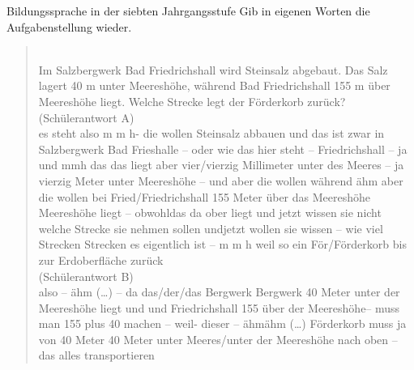 \begin{frame}
  {Bildungssprache in der siebten Jahrgangsstufe}
  \onslide<+->
  \onslide<+->
  \alert{Gib in eigenen Worten die Aufgabenstellung wieder.} \\
  \Halbzeile
  \onslide<+->
  \begin{quote}\footnotesize
    \\
    Im Salzbergwerk Bad Friedrichshall wird Steinsalz abgebaut. Das Salz lagert 40 m unter Meereshöhe, während Bad Friedrichshall 155 m über Meereshöhe liegt. Welche Strecke legt der Förderkorb zurück? \\
    \Halbzeile
    \onslide<+->
    \alert{(Schülerantwort A)}\\
    es steht also m m h- die wollen Steinsalz abbauen und das ist zwar in Salzbergwerk Bad Frieshalle -- oder wie das hier steht -- Friedrichshall -- ja und mmh das das liegt aber vier\slash vierzig Millimeter unter des Meeres -- ja vierzig Meter unter Meereshöhe -- und aber die wollen während ähm aber die wollen bei Fried\slash Friedrichshall 155 Meter über das Meereshöhe Meereshöhe liegt -- obwohldas da ober liegt und jetzt wissen sie nicht welche Strecke sie nehmen sollen undjetzt wollen sie wissen -- wie viel Strecken Strecken es eigentlich ist -- m m h weil so ein För\slash Förderkorb bis zur Erdoberfläche zurück\\
    \Halbzeile
    \onslide<+->
    \alert{(Schülerantwort B)}\\
    also -- ähm (\ldots) -- da das\slash der\slash das Bergwerk Bergwerk 40 Meter unter der Meereshöhe liegt und und Friedrichshall 155 über der Meereshöhe--  muss man 155 plus 40 machen -- weil- dieser -- ähmähm (\ldots) Förderkorb muss ja von 40 Meter 40 Meter unter Meeres\slash unter der Meereshöhe nach oben -- das alles transportieren
  \end{quote}
\end{frame}

